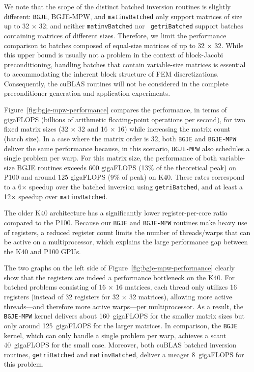 We note that the scope of the distinct batched inversion routines is slightly
different: {\tt BGJE}, {\sc BGJE-MPW}, and {\tt matinvBatched} only support
matrices of size up to 32 $\times$ 32; and neither {\tt matinvBatched} nor {\tt
	getriBatched} support batches containing matrices of different sizes. Therefore,
we limit the performance comparison to batches composed of equal-size matrices
of up to 32 $\times$ 32. While this upper bound is usually not a problem in the
context of block-Jacobi preconditioning, handling batches that contain variable-size 
matrices is essential to accommodating the inherent block structure of FEM
discretizations. Consequently, the cuBLAS routines will not be considered
in the complete preconditioner generation and application experiments.

Figure~\ref{fig:bgje-mpw-performance} compares the performance, in terms of
gigaFLOPS (billions of arithmetic floating-point operations per second), for two 
fixed matrix sizes (32 $\times$ 32 and 16 $\times$ 16) while increasing the matrix count (batch size).
In a case where the matrix order is 32, both {\tt BGJE} and {\tt BGJE-MPW} deliver the
same performance because, in this scenario, {\tt BGJE-MPW} also schedules a single
problem per warp. For this matrix size, the performance of both variable-size
BGJE routines exceeds 600 gigaFLOPS {(13\% of the theoretical peak)} on P100 and
around 125 gigaFLOPS {(9\% of peak)} on K40. These rates correspond to a 6$\times$
speedup over the batched inversion using {\tt getriBatched}, and at least a
12$\times$ speedup over {\tt matinvBatched}.

The older K40 architecture has a significantly lower register-per-core ratio
compared to the P100. Because our {\tt BGJE} and {\tt BGJE-MPW} routines make heavy
use of registers, a reduced register count limits the number of threads/warps
that can be active on a multiprocessor, which explains the large performance gap
between the K40 and P100 GPUs.

The two graphs on the left side of Figure~\ref{fig:bgje-mpw-performance} clearly show 
that the registers are indeed a performance bottleneck on the K40. 
For batched problems consisting of 16 $\times$ 16 matrices, each thread only utilizes 
16 registers (instead of 32 registers for 32 $\times$ 32 matrices), allowing more active 
threads---and therefore more active warps---per
multiprocessor. As a result, the {\tt BGJE-MPW} kernel delivers about 160~gigaFLOPS
for the smaller matrix sizes but only around 125~gigaFLOPS for the larger matrices. In
comparison, the {\tt BGJE} kernel, which can only handle a single problem per
warp, achieves a scant 40~gigaFLOPS for the small case. Moreover, both cuBLAS
batched inversion routines, {\tt getriBatched} and {\tt matinvBatched}, deliver
a meager 8~gigaFLOPS for this problem.

